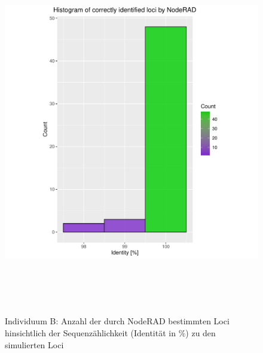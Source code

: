 \begin{figure}[H]
	\begin{center}
		\includegraphics[height=16cm]{bilder/evaluation/hist_perc_ident/B.plot_hist.pdf}
		\caption{Individuum B: Anzahl der durch NodeRAD bestimmten Loci hinsichtlich der Sequenzählichkeit (Identität in $ \% $) zu den simulierten Loci}
	\end{center}
\end{figure}


